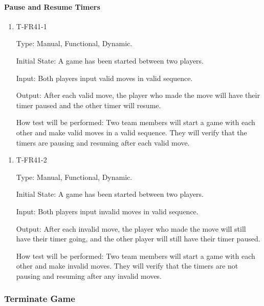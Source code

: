 \documentclass[12pt, titlepage]{article}
\begin{document}
    \paragraph{Pause and Resume Timers}

        \begin{enumerate}

        \item{T-FR41-1\\}

            Type: Manual, Functional, Dynamic.
            					
            Initial State: A game has been started between two players.
            					
            Input: Both players input valid moves in valid sequence.
            					
            Output: After each valid move, the player who made the move will have their timer paused and the other timer will resume.

            How test will be performed: Two team members will start a game with each other and make valid moves in a valid sequence. They will verify that the timers are pausing and resuming after each valid move.

        \end{enumerate}

        \begin{enumerate}

        \item{T-FR41-2\\}

            Type: Manual, Functional, Dynamic.
            					
            Initial State: A game has been started between two players.
            					
            Input: Both players input invalid moves in valid sequence.
            					
            Output: After each invalid move, the player who made the move will still have their timer going, and the other player will still have their timer paused.

            How test will be performed: Two team members will start a game with each other and make invalid moves. They will verify that the timers are not pausing and resuming after any invalid moves.

        \end{enumerate}
        
\subsubsection{Terminate Game}
\end{document}
